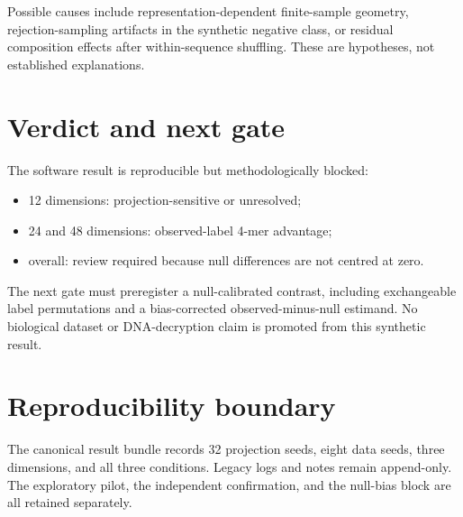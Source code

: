 \documentclass[11pt]{article}
\begin{document}
Possible causes include representation-dependent finite-sample geometry, rejection-sampling artifacts in the synthetic negative class, or residual composition effects after within-sequence shuffling. These are hypotheses, not established explanations.

\section{Verdict and next gate}
The software result is reproducible but methodologically blocked:
\begin{itemize}
  \item 12 dimensions: projection-sensitive or unresolved;
  \item 24 and 48 dimensions: observed-label 4-mer advantage;
  \item overall: review required because null differences are not centred at zero.
\end{itemize}

The next gate must preregister a null-calibrated contrast, including exchangeable label permutations and a bias-corrected observed-minus-null estimand. No biological dataset or DNA-decryption claim is promoted from this synthetic result.

\section{Reproducibility boundary}
The canonical result bundle records 32 projection seeds, eight data seeds, three dimensions, and all three conditions. Legacy logs and notes remain append-only. The exploratory pilot, the independent confirmation, and the null-bias block are all retained separately.
\end{document}
